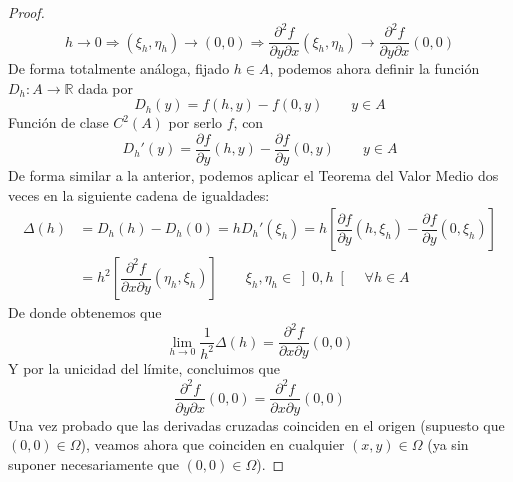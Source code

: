\begin{teo}[de Clairaut]
\begin{proof}
        \begin{equation*}
            h \rightarrow 0 \Longrightarrow (\xi_h, \eta_h) \rightarrow (0,0) \Longrightarrow \dfrac{\partial^2 f}{\partial y\partial x}(\xi_h,\eta_h)\rightarrow  \dfrac{\partial^2 f}{\partial y\partial x}(0,0)
        \end{equation*}
        De forma totalmente análoga, fijado $h\in A$, podemos ahora definir la función $D_h:A\rightarrow\mathbb{R}$ dada por
        \begin{equation*}
            D_h (y) = f(h,y) - f(0,y) \qquad y\in A
        \end{equation*}
        Función de clase $C^2(A)$ por serlo $f$, con
        \begin{equation*}
            D_h'(y) = \dfrac{\partial f}{\partial y}(h,y) - \dfrac{\partial f}{\partial y}(0,y) \qquad y\in A
        \end{equation*}
        De forma similar a la anterior, podemos aplicar el Teorema del Valor Medio dos veces en la siguiente cadena de igualdades:
        \begin{align*}
            \Delta(h) &= D_h(h) - D_h(0) = h D_h'(\xi_h) = h\left[\dfrac{\partial f}{\partial y}(h,\xi_h) - \dfrac{\partial f}{\partial y}(0,\xi_h)\right] \\
                      &= h^2 \left[\dfrac{\partial^2 f}{\partial x\partial y}(\eta_h,\xi_h)\right] \qquad \xi_h, \eta_h \in \left]0,h\right[ \quad \forall h\in A
        \end{align*}
        De donde obtenemos que
        \begin{equation*}
            \lim_{h\to0}\dfrac{1}{h^2}\Delta(h) = \dfrac{\partial^2 f}{\partial x\partial y}(0,0)
        \end{equation*}
        Y por la unicidad del límite, concluimos que
        \begin{equation*}
            \dfrac{\partial^2 f}{\partial y\partial x}(0,0) = \dfrac{\partial^2 f}{\partial x\partial y}(0,0)
        \end{equation*}
        Una vez probado que las derivadas cruzadas coinciden en el origen (supuesto que $(0,0)\in \Omega$), veamos ahora que coinciden en cualquier $(x,y)\in \Omega$ (ya sin suponer necesariamente que $(0,0)\in \Omega$).


\end{proof}
\end{teo}

